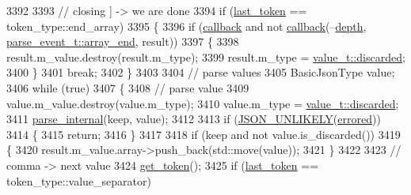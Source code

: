 \begin{DoxyCode}
3392 
3393                 \textcolor{comment}{// closing ] -> we are done}
3394                 \textcolor{keywordflow}{if} (\hyperlink{classnlohmann_1_1detail_1_1parser_a932e49f6f4d291557846744319245994}{last\_token} == token\_type::end\_array)
3395                 \{
3396                     \textcolor{keywordflow}{if} (\hyperlink{classnlohmann_1_1detail_1_1parser_a7600d272ec605e3ffdc8512b3585f476}{callback} and not \hyperlink{classnlohmann_1_1detail_1_1parser_a7600d272ec605e3ffdc8512b3585f476}{callback}(--\hyperlink{classnlohmann_1_1detail_1_1parser_a49dca6af052e9cab3a48dc1eaa163063}{depth}, 
      \hyperlink{classnlohmann_1_1detail_1_1parser_a37ac88c864dda495f72cb62776b0bebea49642fb732aa2e112188fba1f9d3ef7f}{parse\_event\_t::array\_end}, result))
3397                     \{
3398                         result.m\_value.destroy(result.m\_type);
3399                         result.m\_type = \hyperlink{namespacenlohmann_1_1detail_a1ed8fc6239da25abcaf681d30ace4985a94708897ec9db8647dfe695714c98e46}{value\_t::discarded};
3400                     \}
3401                     \textcolor{keywordflow}{break};
3402                 \}
3403 
3404                 \textcolor{comment}{// parse values}
3405                 BasicJsonType value;
3406                 \textcolor{keywordflow}{while} (\textcolor{keyword}{true})
3407                 \{
3408                     \textcolor{comment}{// parse value}
3409                     value.m\_value.destroy(value.m\_type);
3410                     value.m\_type = \hyperlink{namespacenlohmann_1_1detail_a1ed8fc6239da25abcaf681d30ace4985a94708897ec9db8647dfe695714c98e46}{value\_t::discarded};
3411                     \hyperlink{classnlohmann_1_1detail_1_1parser_ace714b4bfb791f97050e0b380d2b50c3}{parse\_internal}(keep, value);
3412 
3413                     \textcolor{keywordflow}{if} (\hyperlink{json_8hpp_ab77582407c64944e7db1ea95ab520253}{JSON\_UNLIKELY}(\hyperlink{classnlohmann_1_1detail_1_1parser_af6a116454a868ebb6628c6137c3dd77d}{errored}))
3414                     \{
3415                         \textcolor{keywordflow}{return};
3416                     \}
3417 
3418                     \textcolor{keywordflow}{if} (keep and not value.is\_discarded())
3419                     \{
3420                         result.m\_value.array->push\_back(std::move(value));
3421                     \}
3422 
3423                     \textcolor{comment}{// comma -> next value}
3424                     \hyperlink{classnlohmann_1_1detail_1_1parser_a33f3859d0dd402445b5859070fd24bab}{get\_token}();
3425                     \textcolor{keywordflow}{if} (\hyperlink{classnlohmann_1_1detail_1_1parser_a932e49f6f4d291557846744319245994}{last\_token} == token\_type::value\_separator)

\end{DoxyCode}
